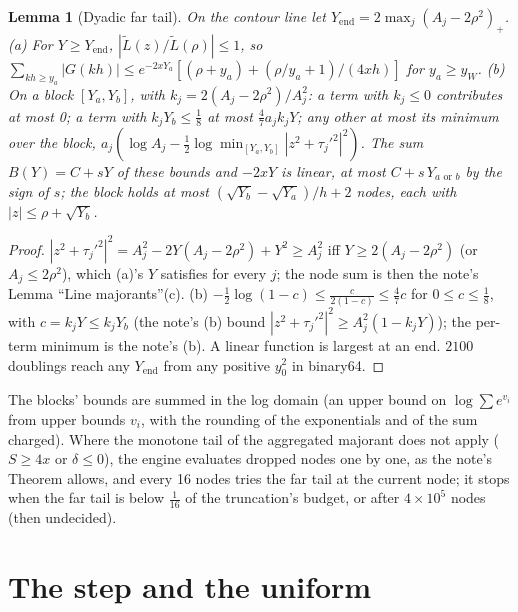 \documentclass[11pt]{article}
\newtheorem{lemma}[theorem]{Lemma}
\theoremstyle{definition}
\newcommand{\Lt}{\widetilde L}
\begin{document}
\begin{lemma}[Dyadic far tail]\label{lem:fartail}
On the contour line let $Y_{\mathrm{end}}=2\max_j(A_j-2\rho^2)_+$. (a) For $Y\ge Y_{\mathrm{end}}$,
$|\Lt(z)/\Lt(\rho)|\le1$, so $\sum_{kh\ge y_a}|G(kh)|\le e^{-2xY_a}[(\rho+y_a)+(\rho/y_a+1)/(4xh)]$ for $y_a\ge
y_W$. (b) On a block $[Y_a,Y_b]$, with $k_j=2(A_j-2\rho^2)/A_j^2$: a term with $k_j\le0$ contributes at most 0; a term
with $k_jY_b\le\frac18$ at most $\frac47a_jk_jY$; any other at most its minimum over the block,
$a_j(\log A_j-\frac12\log\min_{[Y_a,Y_b]}|z^2+\tau_j'^2|^2)$. The sum $B(Y)=C+sY$ of these bounds and $-2xY$ is linear,
at most $C+s\,Y_{a\text{ or }b}$ by the sign of $s$; the block holds at most $(\sqrt{Y_b}-\sqrt{Y_a})/h+2$ nodes, each
with $|z|\le\rho+\sqrt{Y_b}$.
\end{lemma}
\begin{proof}
$|z^2+\tau_j'^2|^2=A_j^2-2Y(A_j-2\rho^2)+Y^2\ge A_j^2$ iff $Y\ge2(A_j-2\rho^2)$ (or $A_j\le2\rho^2$), which (a)'s $Y$
satisfies for every $j$; the node sum is then the note's Lemma ``Line majorants''(c). (b) $-\frac12\log(1-c)\le
\frac c{2(1-c)}\le\frac47c$ for $0\le c\le\frac18$, with $c=k_jY\le k_jY_b$ (the note's (b) bound
$|z^2+\tau_j'^2|^2\ge A_j^2(1-k_jY)$); the per-term minimum is the note's (b). A linear function is largest at an
end. $2100$ doublings reach any $Y_{\mathrm{end}}$ from any positive $y_0^2$ in binary64.
\end{proof}
The blocks' bounds are summed in the log domain (an upper bound on $\log\sum e^{v_i}$ from upper bounds $v_i$, with
the rounding of the exponentials and of the sum charged). Where the monotone tail of the aggregated majorant does
not apply ($S\ge4x$ or $\delta\le0$), the engine evaluates dropped nodes one by one, as the note's Theorem allows,
and every 16 nodes tries the far tail at the current node; it stops when the far tail is below $\frac1{16}$ of the
truncation's budget, or after $4\times10^5$ nodes (then undecided).

\section{The step and the uniform}\label{sec:step}
\end{document}
